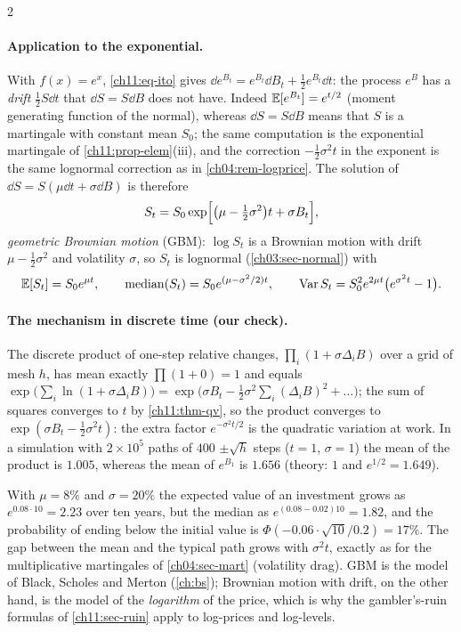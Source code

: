 \begin{paracol}{2}
\paragraph{Application to the exponential.} With $f(x)=e^{x}$, \eqref{ch11:eq-ito} gives $\dd e^{B_t}=e^{B_t}\dd B_t+\tfrac12e^{B_t}\dd t$: the
process $e^{B}$ has a \emph{drift} $\tfrac12S\dd t$ that $\dd S=S\dd B$ does not have. Indeed $\mathbb{E}[e^{B_t}]=e^{t/2}$ (moment generating function of the normal), whereas
$\dd S=S\dd B$ means that $S$ is a martingale with constant mean $S_0$; the same computation is the exponential martingale of
\cref{ch11:prop-elem}(iii), and the correction $-\tfrac12\sigma^2t$ in the exponent is the same lognormal correction as in \cref{ch04:rem-logprice}.
The solution of $\dd S=S(\mu\dd t+\sigma\dd B)$ is therefore
\begin{equation}\label{ch11:eq-gbm}
  S_t=S_0\exp\Bigl[\bigl(\mu-\tfrac12\sigma^2\bigr)t+\sigma B_t\Bigr],
\end{equation}
\emph{geometric Brownian motion} (GBM): $\log S_t$ is a Brownian motion with drift $\mu-\tfrac12\sigma^2$ and volatility $\sigma$, so $S_t$ is lognormal
(\cref{ch03:sec-normal}) with
\[
  \mathbb{E}[S_t]=S_0e^{\mu t},\qquad \operatorname{median}(S_t)=S_0e^{(\mu-\sigma^2/2)t},\qquad \operatorname{Var} S_t=S_0^2e^{2\mu t}\bigl(e^{\sigma^2t}-1\bigr).
\]

\paragraph{The mechanism in discrete time (our check).} The discrete product of one-step relative changes,
$\prod_i(1+\sigma\Delta_iB)$ over a grid of mesh $h$, has mean exactly $\prod(1+0)=1$ and equals
$\exp\bigl(\sum_i\ln(1+\sigma\Delta_iB)\bigr)=\exp\bigl(\sigma B_t-\tfrac12\sigma^2\sum_i(\Delta_iB)^2+\dots\bigr)$; the sum of
squares converges to $t$ by \cref{ch11:thm-qv}, so the product converges to $\exp(\sigma B_t-\tfrac12\sigma^2t)$: the extra
factor $e^{-\sigma^2t/2}$ is the quadratic variation at work. In a simulation with $2\times10^5$ paths of $400$ $\pm\sqrt{h}$ steps ($t=1$, $\sigma=1$) the
mean of the product is $1.005$, whereas the mean of $e^{B_1}$ is $1.656$ (theory: $1$ and $e^{1/2}=1.649$).

\begin{finance}
With $\mu=8\%$ and $\sigma=20\%$ the expected value of an investment grows as $e^{0.08\cdot10}=2.23$ over ten years, but the median as
$e^{(0.08-0.02)10}=1.82$, and the probability of ending below the initial value is $\Phi(-0.06\cdot\sqrt{10}/0.2)=17\%$. The gap between the mean and the typical
path grows with $\sigma^2t$, exactly as for the multiplicative martingales of \cref{ch04:sec-mart} (volatility drag). GBM is the model of Black, Scholes and Merton
(\cref{ch:bs}); Brownian motion with drift, on the other hand, is the model of the \emph{logarithm} of the price, which is why the
gambler's-ruin formulas of \cref{ch11:sec-ruin} apply to log-prices and log-levels.
\end{finance}


\end{paracol}
